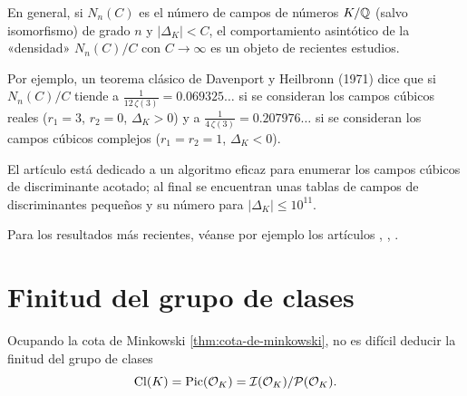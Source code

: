 \begin{comentario}
  En general, si $N_n (C)$ es el número de campos de números $K/\mathbb{Q}$
  (salvo isomorfismo) de grado $n$ y $|\Delta_K| < C$, el comportamiento
  asintótico de la «densidad» $N_n (C)/C$ con $C \to \infty$ es un objeto de
  recientes estudios.

  Por ejemplo, un teorema clásico de Davenport y Heilbronn (1971) dice que si
  $N_n (C)/C$ tiende a $\frac{1}{12\,\zeta (3)} = 0.069325\dots$ si se
  consideran los campos cúbicos reales ($r_1 = 3$, $r_2 = 0$, $\Delta_K > 0$)
  y a $\frac{1}{4\,\zeta (3)} = 0.207976\dots$ si se consideran los campos
  cúbicos complejos ($r_1 = r_2 = 1$, $\Delta_K < 0$).

  El artículo \cite{Belabas-1997} está dedicado a un algoritmo eficaz para
  enumerar los campos cúbicos de discriminante acotado; al final se encuentran
  unas tablas de campos de discriminantes pequeños y su número para
  $|\Delta_K| \le 10^{11}$.

  Para los resultados más recientes, véanse por ejemplo los artículos
  \cite{Bhargava-2005}, \cite{Bhargava-2010}, \cite{Belabas-Bhargava-Pomerance}.
\end{comentario}


\section{Finitud del grupo de clases}

Ocupando la cota de Minkowski \ref{thm:cota-de-minkowski}, no es difícil deducir
la finitud del grupo de clases
$$\operatorname{Cl} (K) = \operatorname{Pic} (\mathcal{O}_K) = \mathcal{I} (\mathcal{O}_K) / \mathcal{P} (\mathcal{O}_K).$$

